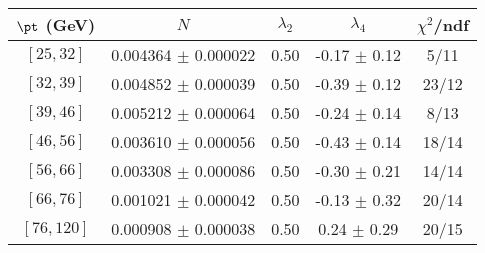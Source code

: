 \begin{tabular}{c||c|c|c|c}
$\pt$ (GeV) & $N$ & $\lambda_{2}$ & $\lambda_4$  & $\chi^2$/ndf  \\
\hline
$[25, 32]$ & 0.004364 $\pm$ 0.000022 & 0.50 & -0.17 $\pm$ 0.12 & 5/11\\
$[32, 39]$ & 0.004852 $\pm$ 0.000039 & 0.50 & -0.39 $\pm$ 0.12 & 23/12\\
$[39, 46]$ & 0.005212 $\pm$ 0.000064 & 0.50 & -0.24 $\pm$ 0.14 & 8/13\\
$[46, 56]$ & 0.003610 $\pm$ 0.000056 & 0.50 & -0.43 $\pm$ 0.14 & 18/14\\
$[56, 66]$ & 0.003308 $\pm$ 0.000086 & 0.50 & -0.30 $\pm$ 0.21 & 14/14\\
$[66, 76]$ & 0.001021 $\pm$ 0.000042 & 0.50 & -0.13 $\pm$ 0.32 & 20/14\\
$[76, 120]$ & 0.000908 $\pm$ 0.000038 & 0.50 & 0.24 $\pm$ 0.29 & 20/15\\
\end{tabular}
